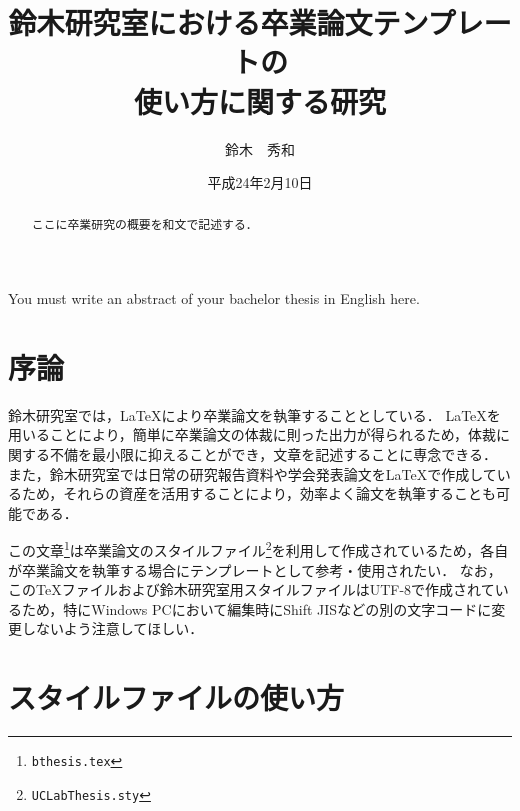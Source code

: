 \documentclass[a4j,11pt]{ujreport}
\title{鈴木研究室における卒業論文テンプレートの\\使い方に関する研究}
\author{鈴木　秀和}
\date{平成24年2月10日}
\begin{document}
\maketitle
\cleardoublepage

\begin{abstract}
ここに卒業研究の概要を和文で記述する．
\end{abstract}
\begin{eabstract}
You must write an abstract of your bachelor thesis in English here.
\end{eabstract}
\cleardoublepage

\tableofcontents
\cleardoublepage




\chapter{序論}\label{chap:Intro}

鈴木研究室では，{\LaTeX}により卒業論文を執筆することとしている．
{\LaTeX}を用いることにより，簡単に卒業論文の体裁に則った出力が得られるため，体裁に関する不備を最小限に抑えることができ，文章を記述することに専念できる．
また，鈴木研究室では日常の研究報告資料や学会発表論文を{\LaTeX}で作成しているため，それらの資産を活用することにより，効率よく論文を執筆することも可能である．

この文章\footnote{\texttt{bthesis.tex}}は卒業論文のスタイルファイル\footnote{\texttt{UCLabThesis.sty}}を利用して作成されているため，各自が卒業論文を執筆する場合にテンプレートとして参考・使用されたい．
なお，この{\TeX}ファイルおよび鈴木研究室用スタイルファイルはUTF-8で作成されているため，特にWindows PCにおいて編集時にShift JISなどの別の文字コードに変更しないよう注意してほしい．


\chapter{スタイルファイルの使い方}\label{chap:HowTo}
\end{document}
